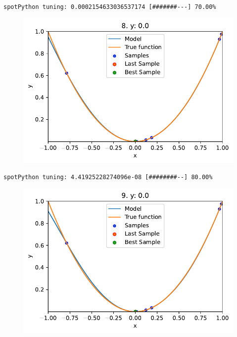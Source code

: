 \documentclass[
  letterpaper,
  DIV=11,
  numbers=noendperiod]{scrreprt}
\begin{document}
\begin{verbatim}
spotPython tuning: 0.0002154633036537174 [#######---] 70.00% 
\end{verbatim}

\begin{figure}[H]

{\centering \includegraphics{04_spot_sklearn_surrogate_files/figure-pdf/cell-21-output-10.pdf}

}

\end{figure}

\begin{verbatim}
spotPython tuning: 4.41925228274096e-08 [########--] 80.00% 
\end{verbatim}

\begin{figure}[H]

{\centering \includegraphics{04_spot_sklearn_surrogate_files/figure-pdf/cell-21-output-12.pdf}

}

\end{figure}
\end{document}
